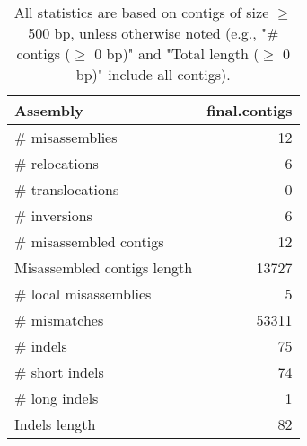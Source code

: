 \documentclass[12pt,a4paper]{article}
\begin{document}
\begin{table}[ht]
\begin{center}
\caption{All statistics are based on contigs of size $\geq$ 500 bp, unless otherwise noted (e.g., "\# contigs ($\geq$ 0 bp)" and "Total length ($\geq$ 0 bp)" include all contigs).}
\begin{tabular}{|l*{1}{|r}|}
\hline
Assembly & final.contigs \\ \hline
\# misassemblies & 12 \\ \hline
\hspace{5mm}\# relocations & 6 \\ \hline
\hspace{5mm}\# translocations & 0 \\ \hline
\hspace{5mm}\# inversions & 6 \\ \hline
\# misassembled contigs & 12 \\ \hline
Misassembled contigs length & 13727 \\ \hline
\# local misassemblies & 5 \\ \hline
\# mismatches & 53311 \\ \hline
\# indels & 75 \\ \hline
\hspace{5mm}\# short indels & 74 \\ \hline
\hspace{5mm}\# long indels & 1 \\ \hline
Indels length & 82 \\ \hline
\end{tabular}
\end{center}
\end{table}
\end{document}

